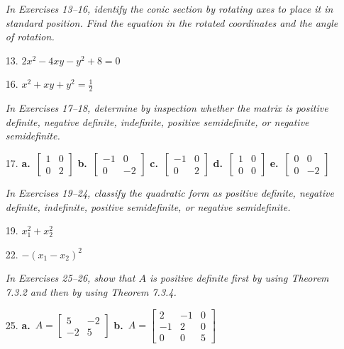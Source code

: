 \documentclass{article}
\begin{document}
\begin{enumerate}
\noindent\textit{In Exercises 13--16, identify the conic section by rotating axes to place it in
standard position. Find the equation in the rotated coordinates and the angle of rotation.}

\item[13.] $2x^2-4xy-y^2+8=0$

\item[16.] $x^2+xy+y^2=\tfrac{1}{2}$

\noindent\textit{In Exercises 17--18, determine by inspection whether the matrix is positive
definite, negative definite, indefinite, positive semidefinite, or negative semidefinite.}

\item[17.]
\textbf{a.}\ $\begin{bmatrix}1&0\\0&2\end{bmatrix}$
\hspace{15pt}
\textbf{b.}\ $\begin{bmatrix}-1&0\\0&-2\end{bmatrix}$
\hspace{15pt}
\textbf{c.}\ $\begin{bmatrix}-1&0\\0&2\end{bmatrix}$
\hspace{15pt}
\textbf{d.}\ $\begin{bmatrix}1&0\\0&0\end{bmatrix}$
\hspace{15pt}
\textbf{e.}\ $\begin{bmatrix}0&0\\0&-2\end{bmatrix}$

\noindent\textit{In Exercises 19--24, classify the quadratic form as positive definite, negative
definite, indefinite, positive semidefinite, or negative semidefinite.}

\item[19.] $x_1^2+x_2^2$

\item[22.] $-(x_1-x_2)^2$

\noindent\textit{In Exercises 25--26, show that $A$ is positive definite first by using
Theorem 7.3.2 and then by using Theorem 7.3.4.}

\item[25.] \textbf{a.}\ $A=\begin{bmatrix}5&-2\\-2&5\end{bmatrix}$
\hspace{20pt}
\textbf{b.}\ $A=\begin{bmatrix}2&-1&0\\-1&2&0\\0&0&5\end{bmatrix}$


\end{enumerate}
\end{document}
